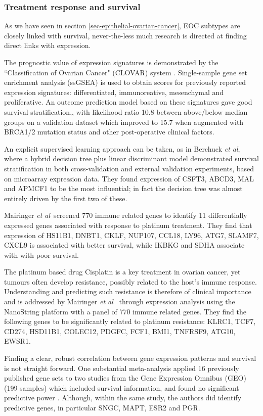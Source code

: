 \documentclass[tikz, 11pt,a4paper,oneside,fleqn]{article}
\newcommand{\etal}{{\em et al\/}}
\begin{document}
\subsubsection{Treatment response and survival}

As we have seen in section \ref{sec-epithelial-ovarian-cancer}, EOC subtypes are closely linked with survival, never-the-less much research is directed at finding direct links with expression.

The prognostic value of expression signatures is demonstrated by the ``Classification of Ovarian Cancer" (CLOVAR) system \cite{Verhaak2013}.  
Single-sample gene set enrichment analysis (ssGSEA) is used to obtain scores for previously reported expression signatures: differentiated, immunoreative, mesenchymal and proliferative.  
An outcome prediction model based on these signatures gave good survival stratification,, with likelihood ratio 10.8 between above/below median groups on a validation dataset which improved to 15.7 when augmented with BRCA1/2 mutation status and other post-operative clinical factors.

An explicit supervised learning approach can be taken, as in Berchuck \etal, where a hybrid decision tree plus linear discriminant model demonstrated survival stratification in both cross-validation and external validation experiments, based on microarray expression data.   
They found expression of CSFT3, ABCD3, MAL and APMCF1 to be the most influential; in fact the decision tree was almost entirely driven by the first two of these.

Mairinger \etal\ screened 770 immune related genes to identify 11 differentially expressed genes associated with response to platinum treatment.  
They find that expression of HS11B1, DNBT1, CKLF, NUP107, CCL18, LY96, ATG7, SLAMF7, CXCL9 is associated with better survival, while IKBKG and SDHA associate with with poor survival.

The platinum based drug Cisplatin is a key treatment in ovarian cancer, yet tumours often develop resistance, possibly related to the host's immune response.  
Understanding and predicting such resistance is therefore of clinical importance and is addressed by Mairinger \etal\ \cite{Mairinger2019} through expression analysis using the NanoString platform with a panel of 770 immune related genes.   
They find the following genes to be significantly related to platinum resistance: KLRC1, TCF7, CD274, HSD11B1, COLEC12, PDGFC, FCF1, BMI1, TNFRSF9, ATG10, EWSR1.

Finding a clear, robust correlation between gene expression patterns and survival is not straight forward.  
One substantial meta-analysis applied 16 previously published gene sets to two studies from the Gene Expression Omnibus (GEO) (199 samples) which included survival information, and found no significant predictive power \cite{Fekete2012}.  
Although, within the same study, the authors did identify predictive genes, in particular SNGC, MAPT, ESR2 and PGR.
\end{document}
